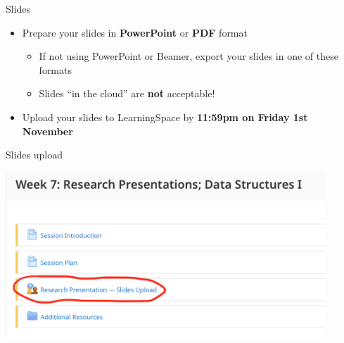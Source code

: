 \begin{frame}{Slides}
    \begin{itemize}
        \pause\item Prepare your slides in \textbf{PowerPoint} or \textbf{PDF} format
        \begin{itemize}
            \pause\item If not using PowerPoint or Beamer, export your slides in one of these formats
            \pause\item Slides ``in the cloud'' are \textbf{not} acceptable!
        \end{itemize}
        \pause\item Upload your slides to LearningSpace by \textbf{11:59pm on Friday 1st November}
    \end{itemize}
\end{frame}

\begin{frame}{Slides upload}
    \begin{center}
        \includegraphics[width=0.9\textwidth]{slides_upload}
    \end{center}
\end{frame}

